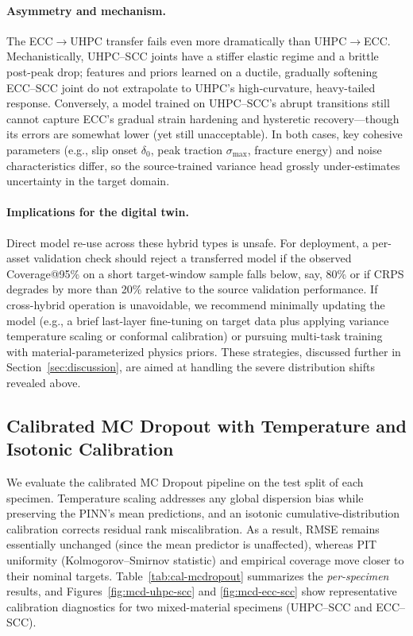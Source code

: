 \documentclass{article}
\begin{document}
\paragraph{Asymmetry and mechanism.} The ECC$\rightarrow$UHPC transfer fails even more dramatically than UHPC$\rightarrow$ECC. Mechanistically, UHPC–SCC joints have a stiffer elastic regime and a brittle post-peak drop; features and priors learned on a ductile, gradually softening ECC–SCC joint do not extrapolate to UHPC’s high-curvature, heavy-tailed response. Conversely, a model trained on UHPC–SCC’s abrupt transitions still cannot capture ECC’s gradual strain hardening and hysteretic recovery—though its errors are somewhat lower (yet still unacceptable). In both cases, key cohesive parameters (e.g., slip onset $\delta_0$, peak traction $\sigma_{\max}$, fracture energy) and noise characteristics differ, so the source-trained variance head grossly under-estimates uncertainty in the target domain.

\paragraph{Implications for the digital twin.} Direct model re-use across these hybrid types is unsafe. For deployment, a per-asset validation check should reject a transferred model if the observed Coverage@95\% on a short target-window sample falls below, say, 80\% or if CRPS degrades by more than 20\% relative to the source validation performance. If cross-hybrid operation is unavoidable, we recommend minimally updating the model (e.g., a brief last-layer fine-tuning on target data plus applying variance temperature scaling or conformal calibration) or pursuing multi-task training with material-parameterized physics priors. These strategies, discussed further in Section~\ref{sec:discussion}, are aimed at handling the severe distribution shifts revealed above.



\subsection{Calibrated MC Dropout with Temperature and Isotonic Calibration}
\label{subsec:results-calibrated-mcd}

We evaluate the calibrated MC Dropout pipeline on the test split of each specimen. Temperature scaling addresses any global dispersion bias while preserving the PINN’s mean predictions, and an isotonic cumulative-distribution calibration corrects residual rank miscalibration. As a result, RMSE remains essentially unchanged (since the mean predictor is unaffected), whereas PIT uniformity (Kolmogorov–Smirnov statistic) and empirical coverage move closer to their nominal targets. Table~\ref{tab:cal-mcdropout} summarizes the \emph{per-specimen} results, and Figures~\ref{fig:mcd-uhpc-scc} and \ref{fig:mcd-ecc-scc} show representative calibration diagnostics for two mixed-material specimens (UHPC–SCC and ECC–SCC).
\end{document}
